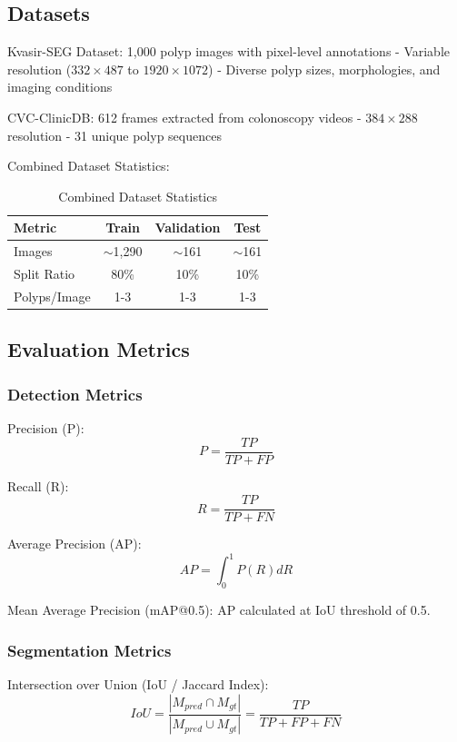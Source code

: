 \documentclass[runningheads]{llncs}
\begin{document}
\subsection{Datasets}
\noindent Kvasir-SEG Dataset: 1,000 polyp images with pixel-level annotations - Variable resolution ($332\times487$ to $1920\times1072$) - Diverse polyp sizes, morphologies, and imaging conditions

\noindent CVC-ClinicDB: 612 frames extracted from colonoscopy videos - $384\times288$ resolution - 31 unique polyp sequences

\noindent Combined Dataset Statistics:

\begin{table}[H]
\caption{Combined Dataset Statistics}
\label{tab:dataset_stats}
\centering
\begin{tabular}{lccc}
\toprule
\textbf{Metric} & \textbf{Train} & \textbf{Validation} & \textbf{Test} \\
\midrule
Images & $\sim$1,290 & $\sim$161 & $\sim$161 \\
Split Ratio & 80\% & 10\% & 10\% \\
Polyps/Image & 1-3 & 1-3 & 1-3 \\
\bottomrule
\end{tabular}
\end{table}

\subsection{Evaluation Metrics}

\subsubsection{Detection Metrics}
\noindent Precision (P):
\begin{equation}
P=\frac{TP}{TP+FP}
\end{equation}

\noindent Recall (R):
\begin{equation}
R=\frac{TP}{TP+FN}
\end{equation}

\noindent Average Precision (AP):
\begin{equation}
AP=\int_{0}^{1}P(R)dR
\end{equation}

\noindent Mean Average Precision (mAP@0.5): AP calculated at IoU threshold of 0.5.

\subsubsection{Segmentation Metrics}
\noindent Intersection over Union (IoU / Jaccard Index):
\begin{equation}
IoU=\frac{|M_{pred} \cap M_{gt}|}{|M_{pred} \cup M_{gt}|}=\frac{TP}{TP+FP+FN}
\end{equation}
\end{document}
